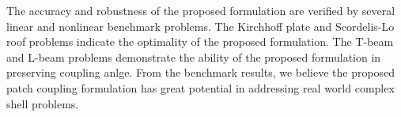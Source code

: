 The accuracy and robustness of the proposed formulation are verified by several linear and nonlinear benchmark problems. The Kirchhoff plate and Scordelis-Lo roof problems indicate the optimality of the proposed formulation. The T-beam and L-beam problems demonstrate the ability of the proposed formulation in preserving coupling anlge. From the benchmark results, we believe the proposed patch coupling formulation has great potential in addressing real world complex shell problems.